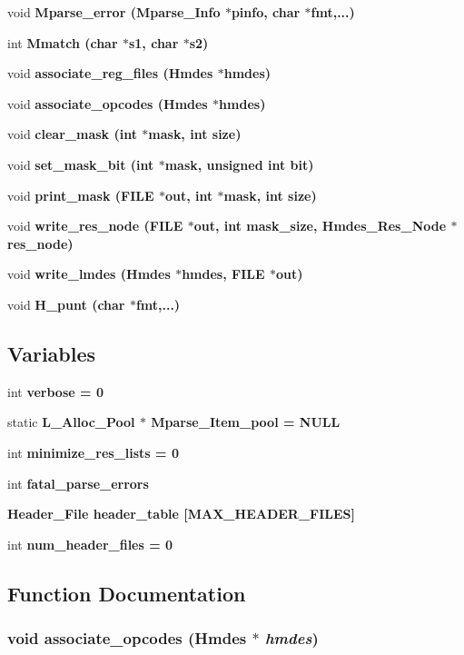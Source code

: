 \begin{CompactItemize}
\item 
void \bf{Mparse\_\-error} (\bf{Mparse\_\-Info} $\ast$pinfo, char $\ast$fmt,...)
\item 
int \bf{Mmatch} (char $\ast$s1, char $\ast$s2)
\item 
void \bf{associate\_\-reg\_\-files} (\bf{Hmdes} $\ast$hmdes)
\item 
void \bf{associate\_\-opcodes} (\bf{Hmdes} $\ast$hmdes)
\item 
void \bf{clear\_\-mask} (int $\ast$mask, int size)
\item 
void \bf{set\_\-mask\_\-bit} (int $\ast$mask, unsigned int bit)
\item 
void \bf{print\_\-mask} (FILE $\ast$out, int $\ast$mask, int size)
\item 
void \bf{write\_\-res\_\-node} (FILE $\ast$out, int mask\_\-size, \bf{Hmdes\_\-Res\_\-Node} $\ast$res\_\-node)
\item 
void \bf{write\_\-lmdes} (\bf{Hmdes} $\ast$hmdes, FILE $\ast$out)
\item 
void \bf{H\_\-punt} (char $\ast$fmt,...)
\end{CompactItemize}
\subsection*{Variables}
\begin{CompactItemize}
\item 
int \bf{verbose} = 0
\item 
static \bf{L\_\-Alloc\_\-Pool} $\ast$ \bf{Mparse\_\-Item\_\-pool} = \bf{NULL}
\item 
int \bf{minimize\_\-res\_\-lists} = 0
\item 
int \bf{fatal\_\-parse\_\-errors}
\item 
\bf{Header\_\-File} \bf{header\_\-table} [MAX\_\-HEADER\_\-FILES]
\item 
int \bf{num\_\-header\_\-files} = 0
\end{CompactItemize}


\subsection{Function Documentation}
\subsubsection{\setlength{\rightskip}{0pt plus 5cm}void associate\_\-opcodes (\bf{Hmdes} $\ast$ {\em hmdes})}\label{hmdes_8c_2a96f6a3e990175d267175838cda8cf4}




